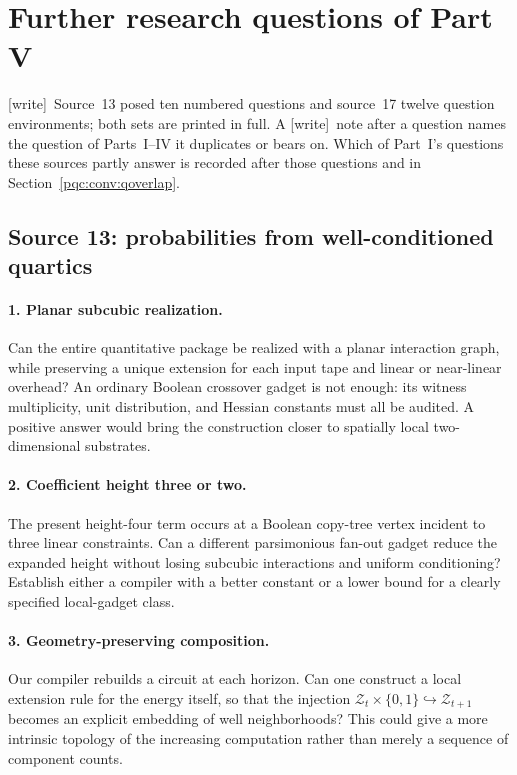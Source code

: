 \documentclass[11pt,letterpaper]{article}
\numberwithin{equation}{section}
\theoremstyle{definition}
\theoremstyle{remark}
\newcommand{\wtag}{\textup{[write]}}
\newcommand{\Bit}{\{0,1\}}
\newcommand{\cZ}{\mathcal Z}
\begin{document}
\section{Further research questions of Part V}
\label{pqc:conv:b62-V:questions}
\wtag\ Source~13 posed ten numbered questions and source~17 twelve question
environments; both sets are printed in full. A \wtag\ note after a question
names the question of Parts~I--IV it duplicates or bears on. Which of Part~I's
questions these sources partly answer is recorded after those questions and in
Section~\ref{pqc:conv:qoverlap}.

\subsection{Source 13: probabilities from well-conditioned quartics}\label{pqc:ql:sec:future}

\paragraph{1. Planar subcubic realization.}
Can the entire quantitative package be realized with a planar interaction
graph, while preserving a unique extension for each input tape and linear
or near-linear overhead? An ordinary Boolean crossover gadget is not
enough: its witness multiplicity, unit distribution, and Hessian constants
must all be audited. A positive answer would bring the construction closer
to spatially local two-dimensional substrates.

\paragraph{2. Coefficient height three or two.}
The present height-four term occurs at a Boolean copy-tree vertex incident
to three linear constraints. Can a different parsimonious fan-out gadget
reduce the expanded height without losing subcubic interactions and
uniform conditioning? Establish either a compiler with a better constant
or a lower bound for a clearly specified local-gadget class.

\paragraph{3. Geometry-preserving composition.}
Our compiler rebuilds a circuit at each horizon. Can one construct a
local extension rule for the energy itself, so that the injection
$\cZ_t\times\Bit\hookrightarrow\cZ_{t+1}$ becomes an explicit embedding
of well neighborhoods? This could give a more intrinsic topology of the
increasing computation rather than merely a sequence of component counts.
\end{document}
